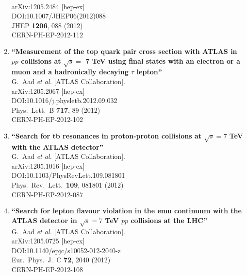 \documentclass{article}
\begin{document}
\begin{enumerate}
  \\{}arXiv:1205.2484 [hep-ex]
  \\{}DOI:10.1007/JHEP06(2012)088
  \\{}JHEP {\bf 1206}, 088 (2012)
  \\{}CERN-PH-EP-2012-112
\item%
{\bf ``Measurement of the top quark pair cross section with ATLAS in $pp$ collisions at $\sqrt{s} =$ 7 TeV using final states with an electron or a muon and a hadronically decaying $\tau$ lepton''}
  \\{}G.~Aad {\it et al.} [ATLAS Collaboration].
  \\{}arXiv:1205.2067 [hep-ex]
  \\{}DOI:10.1016/j.physletb.2012.09.032
  \\{}Phys.\ Lett.\ B {\bf 717}, 89 (2012)
  \\{}CERN-PH-EP-2012-102
\item%
{\bf ``Search for tb resonances in proton-proton collisions at $\sqrt{s}=7$ TeV with the ATLAS detector''}
  \\{}G.~Aad {\it et al.} [ATLAS Collaboration].
  \\{}arXiv:1205.1016 [hep-ex]
  \\{}DOI:10.1103/PhysRevLett.109.081801
  \\{}Phys.\ Rev.\ Lett.\  {\bf 109}, 081801 (2012)
  \\{}CERN-PH-EP-2012-087
\item%
{\bf ``Search for lepton flavour violation in the emu continuum with the ATLAS detector in $\sqrt{s}=7$ TeV $pp$ collisions at the LHC''}
  \\{}G.~Aad {\it et al.} [ATLAS Collaboration].
  \\{}arXiv:1205.0725 [hep-ex]
  \\{}DOI:10.1140/epjc/s10052-012-2040-z
  \\{}Eur.\ Phys.\ J.\ C {\bf 72}, 2040 (2012)
  \\{}CERN-PH-EP-2012-108

\end{enumerate}
\end{document}
